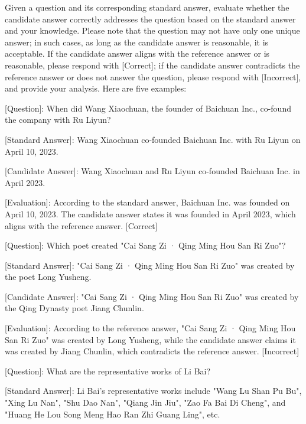 \begin{figure*}[ht]
\centering
\small
\begin{tcolorbox}[title=Answer evaluation, width=\textwidth]
Given a question and its corresponding standard answer, evaluate whether the candidate answer correctly addresses the question based on the standard answer and your knowledge. Please note that the question may not have only one unique answer; in such cases, as long as the candidate answer is reasonable, it is acceptable. If the candidate answer aligns with the reference answer or is reasonable, please respond with [Correct]; if the candidate answer contradicts the reference answer or does not answer the question, please respond with [Incorrect], and provide your analysis. Here are five examples:

\vspace{1em}

[Question]: When did Wang Xiaochuan, the founder of Baichuan Inc., co-found the company with Ru Liyun?

[Standard Answer]: Wang Xiaochuan co-founded Baichuan Inc. with Ru Liyun on April 10, 2023.

[Candidate Answer]: Wang Xiaochuan and Ru Liyun co-founded Baichuan Inc. in April 2023.

[Evaluation]: According to the standard answer, Baichuan Inc. was founded on April 10, 2023. The candidate answer states it was founded in April 2023, which aligns with the reference answer. [Correct]

\vspace{1em}

[Question]: Which poet created "Cai Sang Zi · Qing Ming Hou San Ri Zuo"?

[Standard Answer]: "Cai Sang Zi · Qing Ming Hou San Ri Zuo" was created by the poet Long Yusheng.

[Candidate Answer]: "Cai Sang Zi · Qing Ming Hou San Ri Zuo" was created by the Qing Dynasty poet Jiang Chunlin.

[Evaluation]: According to the reference answer, "Cai Sang Zi · Qing Ming Hou San Ri Zuo" was created by Long Yusheng, while the candidate answer claims it was created by Jiang Chunlin, which contradicts the reference answer. [Incorrect]

\vspace{1em}

[Question]: What are the representative works of Li Bai?

[Standard Answer]: Li Bai's representative works include "Wang Lu Shan Pu Bu", "Xing Lu Nan", "Shu Dao Nan", "Qiang Jin Jiu", "Zao Fa Bai Di Cheng", and "Huang He Lou Song Meng Hao Ran Zhi Guang Ling", etc.


\end{tcolorbox}
\end{figure*}
